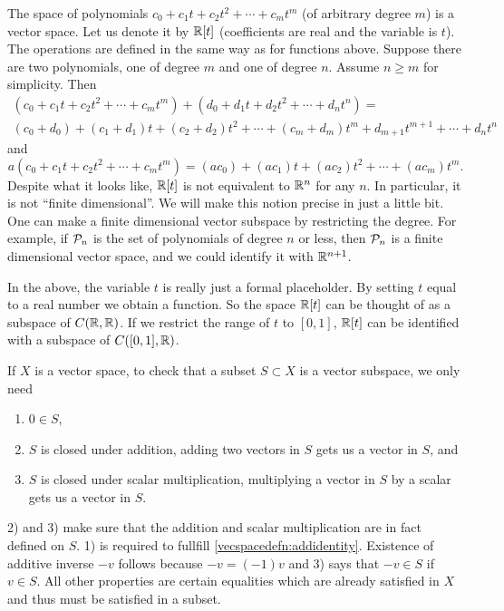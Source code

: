\begin{example}
The space of polynomials $c_0 + c_1 t + c_2 t^2 + \cdots + c_m t^m$
(of arbitrary degree $m$) is a vector space.
Let us denote it by ${\mathbb{R}}[t]$ (coefficients are real and
the variable is $t$).  The operations are defined in the same way as for
functions above.
Suppose there are
two polynomials, one of degree $m$ and one of degree $n$.  Assume $n
\geq m$ for simplicity.  Then
\begin{multline*}
(c_0 + c_1 t + c_2 t^2 + \cdots + c_m t^m)
+
(d_0 + d_1 t + d_2 t^2 + \cdots + d_n t^n)
= \\
(c_0+d_0) + (c_1+d_1) t + (c_2 + d_2) t^2 + \cdots + (c_m+d_m) t^m
+ d_{m+1} t^{m+1} + \cdots + d_n t^n
\end{multline*}
and
\begin{equation*}
a(c_0 + c_1 t + c_2 t^2 + \cdots + c_m t^m)
=
(ac_0) + (ac_1) t + (ac_2) t^2 + \cdots + (ac_m) t^m  .
\end{equation*}
Despite what it looks like, ${\mathbb{R}}[t]$ is not equivalent to ${\mathbb{R}}^n$ for any $n$.  In
particular, it is not ``finite dimensional''.  We will make this notion
precise in just a little bit.  One can make a finite
dimensional vector subspace by restricting the degree.  For example,
if ${\mathcal{P}}_n$ is the set of polynomials of degree $n$ or less,
then ${\mathcal{P}}_n$ is a finite dimensional vector space, and we could 
identify it with ${\mathbb{R}}^{n+1}$.

In the above, the variable $t$ is really just a formal placeholder.
By setting $t$ equal to a real number we obtain a function.
So the space ${\mathbb{R}}[t]$ can be thought of as a subspace of $C({\mathbb{R}},{\mathbb{R}})$.
If we restrict the range of $t$ to $[0,1]$, ${\mathbb{R}}[t]$ can be identified with
a subspace of $C([0,1],{\mathbb{R}})$.
\end{example}

\begin{remark}
If $X$ is a vector space, to check that a subset $S \subset X$
is a vector subspace, we only need
\begin{enumerate}[1)]
\item
$0 \in S$,
\item
$S$ is closed under addition, adding two vectors in $S$ gets us a vector in
$S$, and
\item
$S$ is closed under scalar multiplication, multiplying a vector in
$S$ by a scalar gets us a vector in $S$.
\end{enumerate}
2) and 3)
make sure that the addition and scalar multiplication are in fact defined on
$S$.  1) is required
to fullfill \ref{vecspacedefn:addidentity}.  Existence
of additive inverse $-v$ follows because $-v = (-1)v$ and 3) says that
$-v \in S$ if $v \in S$.  All other properties are certain equalities
which are already satisfied in $X$ and thus must be satisfied in a subset.
\end{remark}

